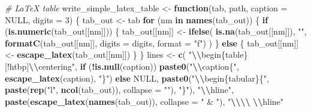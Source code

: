\documentclass[
]{article}
\newenvironment{Shaded}{\begin{snugshade}}{\end{snugshade}}
\newcommand{\AttributeTok}[1]{\textcolor[rgb]{0.13,0.29,0.53}{#1}}
\newcommand{\CommentTok}[1]{\textcolor[rgb]{0.56,0.35,0.01}{\textit{#1}}}
\newcommand{\ConstantTok}[1]{\textcolor[rgb]{0.56,0.35,0.01}{#1}}
\newcommand{\ControlFlowTok}[1]{\textcolor[rgb]{0.13,0.29,0.53}{\textbf{#1}}}
\newcommand{\DecValTok}[1]{\textcolor[rgb]{0.00,0.00,0.81}{#1}}
\newcommand{\FunctionTok}[1]{\textcolor[rgb]{0.13,0.29,0.53}{\textbf{#1}}}
\newcommand{\NormalTok}[1]{#1}
\newcommand{\OtherTok}[1]{\textcolor[rgb]{0.56,0.35,0.01}{#1}}
\newcommand{\SpecialCharTok}[1]{\textcolor[rgb]{0.81,0.36,0.00}{\textbf{#1}}}
\newcommand{\StringTok}[1]{\textcolor[rgb]{0.31,0.60,0.02}{#1}}
\begin{document}
\begin{Shaded}
\begin{Highlighting}[]
\CommentTok{\# LaTeX table}
\NormalTok{write\_simple\_latex\_table }\OtherTok{\textless{}{-}} \ControlFlowTok{function}\NormalTok{(tab, path, }\AttributeTok{caption =} \ConstantTok{NULL}\NormalTok{, }\AttributeTok{digits =} \DecValTok{3}\NormalTok{) \{}
\NormalTok{    tab\_out }\OtherTok{\textless{}{-}}\NormalTok{ tab}
    \ControlFlowTok{for}\NormalTok{ (nm }\ControlFlowTok{in} \FunctionTok{names}\NormalTok{(tab\_out)) \{}
        \ControlFlowTok{if}\NormalTok{ (}\FunctionTok{is.numeric}\NormalTok{(tab\_out[[nm]])) \{}
\NormalTok{            tab\_out[[nm]] }\OtherTok{\textless{}{-}} \FunctionTok{ifelse}\NormalTok{(}
                \FunctionTok{is.na}\NormalTok{(tab\_out[[nm]]),}
                \StringTok{""}\NormalTok{,}
                \FunctionTok{formatC}\NormalTok{(tab\_out[[nm]], }\AttributeTok{digits =}\NormalTok{ digits, }\AttributeTok{format =} \StringTok{"f"}\NormalTok{)}
\NormalTok{            )}
\NormalTok{        \} }\ControlFlowTok{else}\NormalTok{ \{}
\NormalTok{            tab\_out[[nm]] }\OtherTok{\textless{}{-}} \FunctionTok{escape\_latex}\NormalTok{(tab\_out[[nm]])}
\NormalTok{        \}}
\NormalTok{    \}}
\NormalTok{    lines }\OtherTok{\textless{}{-}} \FunctionTok{c}\NormalTok{(}
        \StringTok{"}\SpecialCharTok{\textbackslash{}\textbackslash{}}\StringTok{begin\{table\}[!htbp]}\SpecialCharTok{\textbackslash{}\textbackslash{}}\StringTok{centering"}\NormalTok{,}
        \ControlFlowTok{if}\NormalTok{ (}\SpecialCharTok{!}\FunctionTok{is.null}\NormalTok{(caption)) }\FunctionTok{paste0}\NormalTok{(}\StringTok{"}\SpecialCharTok{\textbackslash{}\textbackslash{}}\StringTok{caption\{"}\NormalTok{, }\FunctionTok{escape\_latex}\NormalTok{(caption), }\StringTok{"\}"}\NormalTok{) }\ControlFlowTok{else} \ConstantTok{NULL}\NormalTok{,}
        \FunctionTok{paste0}\NormalTok{(}\StringTok{"}\SpecialCharTok{\textbackslash{}\textbackslash{}}\StringTok{begin\{tabular\}\{"}\NormalTok{, }\FunctionTok{paste}\NormalTok{(}\FunctionTok{rep}\NormalTok{(}\StringTok{"l"}\NormalTok{, }\FunctionTok{ncol}\NormalTok{(tab\_out)), }\AttributeTok{collapse =} \StringTok{""}\NormalTok{), }\StringTok{"\}"}\NormalTok{),}
        \StringTok{"}\SpecialCharTok{\textbackslash{}\textbackslash{}}\StringTok{hline"}\NormalTok{,}
        \FunctionTok{paste}\NormalTok{(}\FunctionTok{escape\_latex}\NormalTok{(}\FunctionTok{names}\NormalTok{(tab\_out)), }\AttributeTok{collapse =} \StringTok{" \& "}\NormalTok{),}
        \StringTok{"}\SpecialCharTok{\textbackslash{}\textbackslash{}\textbackslash{}\textbackslash{}}\StringTok{ }\SpecialCharTok{\textbackslash{}\textbackslash{}}\StringTok{hline"}

\end{Highlighting}
\end{Shaded}
\end{document}
